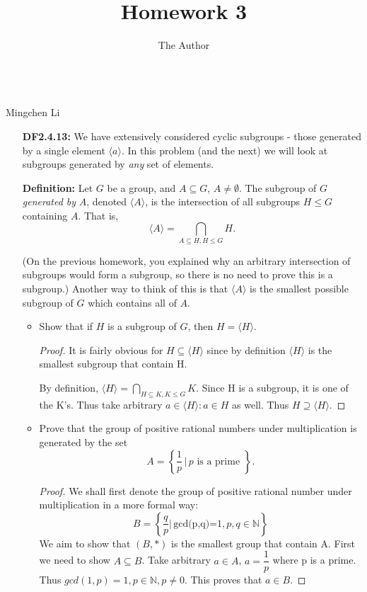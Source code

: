 \documentclass[11pt, oneside]{article}
\title{Homework 3}
\author{The Author}
\newcommand{\N}{\mathbb N}
\begin{document}
\begin{center}\\Mingchen Li\\ \end{center}
\thispagestyle{empty}
\hrulefill %



\begin{enumerate}

\item[{\bf DF2.4.13:}] We have extensively considered cyclic subgroups - those generated by a single element $\langle a \rangle$. In this problem (and the next) we will look at subgroups generated by {\it any} set of elements.

{\bf Definition:} Let $G$ be a group, and $A\subseteq G$, $A\neq \emptyset$. The subgroup of $G$ {\it generated by} $A$, denoted $\langle A \rangle$, is the intersection of all subgroups $H\leq G$ containing $A$. That is, $$\langle A \rangle = \bigcap_{A\subseteq H,  H\leq G} H.$$

(On the previous homework, you explained why an arbitrary intersection of subgroups would form a subgroup, so there is no need to prove this is a subgroup.) Another way to think of this is that $\langle A \rangle$ is the smallest possible subgroup of $G$ which contains all of $A$.

\begin{itemize}
\item Show that if $H$ is a subgroup of $G$, then $H=\langle H \rangle$. 

\begin{proof}
It is fairly obvious for $H\subseteq \langle H \rangle$ since by definition $\langle H \rangle$ is the smallest subgroup that contain H. 

By definition, $\langle H \rangle= \bigcap_{H\subseteq K,  K\leq G} K$. Since H is a subgroup, it is one of the K's. Thus take arbitrary $a\in \langle H \rangle: a\in H$ as well. Thus $H\supseteq \langle H \rangle$. 
\end{proof}

\item Prove that the group of positive rational numbers under multiplication is generated by the set $$A=\left\{\frac{1}{p}\,\bigg|\, p \text{ is a prime }\right\}.$$
\begin{proof}
We shall first denote the group of positive rational number under multiplication in a more formal way:
\[B=\left\{\dfrac{q}{p}\bigg|\, \text{gcd(p,q)=1}, p,q\in \N \right\}\]
We aim to show that $(B, *)$ is the smallest group that contain A. First we need to show $A\subseteq B$. Take arbitrary $a\in A$, $a=\dfrac{1}{p}$ where p is a prime. Thus $gcd(1, p)=1, p\in \N, p\neq 0. $ This proves that $a\in B$.


\end{proof}
\end{itemize}
\end{enumerate}
\end{document}
